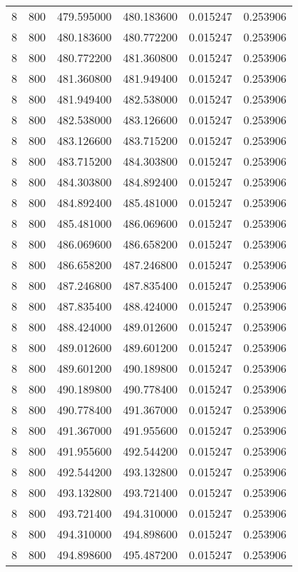 \begin{longtable}{rrrrrr}
8 & 800 & 479.595000 & 480.183600 & 0.015247 & 0.253906 \\
8 & 800 & 480.183600 & 480.772200 & 0.015247 & 0.253906 \\
8 & 800 & 480.772200 & 481.360800 & 0.015247 & 0.253906 \\
8 & 800 & 481.360800 & 481.949400 & 0.015247 & 0.253906 \\
8 & 800 & 481.949400 & 482.538000 & 0.015247 & 0.253906 \\
8 & 800 & 482.538000 & 483.126600 & 0.015247 & 0.253906 \\
8 & 800 & 483.126600 & 483.715200 & 0.015247 & 0.253906 \\
8 & 800 & 483.715200 & 484.303800 & 0.015247 & 0.253906 \\
8 & 800 & 484.303800 & 484.892400 & 0.015247 & 0.253906 \\
8 & 800 & 484.892400 & 485.481000 & 0.015247 & 0.253906 \\
8 & 800 & 485.481000 & 486.069600 & 0.015247 & 0.253906 \\
8 & 800 & 486.069600 & 486.658200 & 0.015247 & 0.253906 \\
8 & 800 & 486.658200 & 487.246800 & 0.015247 & 0.253906 \\
8 & 800 & 487.246800 & 487.835400 & 0.015247 & 0.253906 \\
8 & 800 & 487.835400 & 488.424000 & 0.015247 & 0.253906 \\
8 & 800 & 488.424000 & 489.012600 & 0.015247 & 0.253906 \\
8 & 800 & 489.012600 & 489.601200 & 0.015247 & 0.253906 \\
8 & 800 & 489.601200 & 490.189800 & 0.015247 & 0.253906 \\
8 & 800 & 490.189800 & 490.778400 & 0.015247 & 0.253906 \\
8 & 800 & 490.778400 & 491.367000 & 0.015247 & 0.253906 \\
8 & 800 & 491.367000 & 491.955600 & 0.015247 & 0.253906 \\
8 & 800 & 491.955600 & 492.544200 & 0.015247 & 0.253906 \\
8 & 800 & 492.544200 & 493.132800 & 0.015247 & 0.253906 \\
8 & 800 & 493.132800 & 493.721400 & 0.015247 & 0.253906 \\
8 & 800 & 493.721400 & 494.310000 & 0.015247 & 0.253906 \\
8 & 800 & 494.310000 & 494.898600 & 0.015247 & 0.253906 \\
8 & 800 & 494.898600 & 495.487200 & 0.015247 & 0.253906 \\

\end{longtable}
